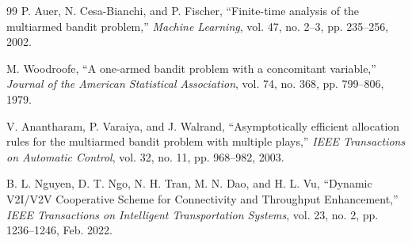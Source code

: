 \documentclass[12pt,a4paper]{article}
\begin{document}
\begin{thebibliography}{99}
P. Auer, N. Cesa-Bianchi, and P. Fischer, ``Finite-time analysis of the multiarmed
bandit problem,'' \textit{Machine Learning}, vol. 47, no. 2--3, pp. 235--256, 2002.

M. Woodroofe, ``A one-armed bandit problem with a concomitant variable,''
\textit{Journal of the American Statistical Association}, vol. 74, no. 368,
pp. 799--806, 1979.

V. Anantharam, P. Varaiya, and J. Walrand, ``Asymptotically efficient allocation
rules for the multiarmed bandit problem with multiple plays,'' \textit{IEEE
Transactions on Automatic Control}, vol. 32, no. 11, pp. 968--982, 2003.

B. L. Nguyen, D. T. Ngo, N. H. Tran, M. N. Dao, and H. L. Vu,
``Dynamic V2I/V2V Cooperative Scheme for Connectivity and Throughput Enhancement,''
\textit{IEEE Transactions on Intelligent Transportation Systems}, vol. 23, no. 2,
pp. 1236--1246, Feb. 2022.

\end{thebibliography}
\end{document}
